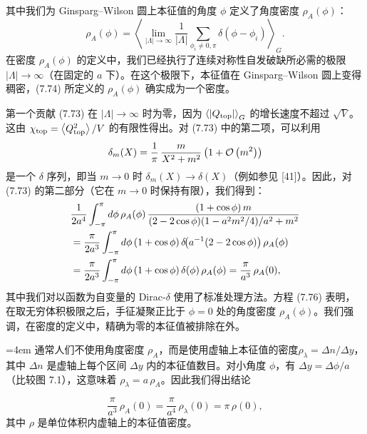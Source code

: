 其中我们为 Ginsparg--Wilson 圆上本征值的角度 $\phi$ 定义了角度密度 $\rho_A(\phi)$：
\begin{equation}
  \rho_A(\phi) = \left\langle \lim_{|\Lambda|\to\infty}\frac{1}{|\Lambda|}
  \sum_{\phi_i \neq 0,\pi}\delta(\phi-\phi_i)\right\rangle_G .
\end{equation}
在密度 $\rho_A(\phi)$ 的定义中，我们已经执行了连续对称性自发破缺所必需的极限 $|\Lambda| \to \infty$（在固定的 $a$ 下）。在这个极限下，本征值在 Ginsparg--Wilson 圆上变得稠密，(7.74) 所定义的 $\rho_A(\phi)$ 确实成为一个密度。

第一个贡献 (7.73) 在 $|\Lambda| \to \infty$ 时为零，因为 $\left\langle |Q_{\mathrm{top}}| \right\rangle_G$ 的增长速度不超过 $\sqrt{V}$。这由 $\chi_{\mathrm{top}} = \left\langle Q^2_{\mathrm{top}} \right\rangle/V$ 的有限性得出。对 (7.73) 中的第二项，可以利用
\begin{equation}
  \delta_m(X) = \frac{1}{\pi}\,\frac{m}{X^2 + m^2}\left(1 + \mathcal{O}\left(m^2\right)\right)
\end{equation}
是一个 $\delta$ 序列，即当 $m \to 0$ 时 $\delta_m(X) \to \delta(X)$（例如参见 [41]）。因此，对 (7.73) 的第二部分（它在 $m \to 0$ 时保持有限），我们得到：
\begin{align}
  &\frac{1}{2a^4}\int_{-\pi}^{\pi}d\phi\,\rho_A(\phi)\,
    \frac{(1+\cos\phi)\,m}{(2-2\cos\phi)(1-a^2m^2/4)/a^2 + m^2} \notag\\
  &= \frac{\pi}{2a^3}\int_{-\pi}^{\pi}d\phi\,(1+\cos\phi)\,
     \delta\!\bigl(a^{-1}(2-2\cos\phi)\bigr)\,\rho_A(\phi) \notag\\
  &= \frac{\pi}{2a^3}\int_{-\pi}^{\pi}d\phi\,(1+\cos\phi)\,
     \delta(\phi)\,\rho_A(\phi) = \frac{\pi}{a^3}\,\rho_A(0),
\end{align}
其中我们对以函数为自变量的 Dirac-$\delta$ 使用了标准处理方法。方程 (7.76) 表明，在取无穷体积极限之后，手征凝聚正比于 $\phi = 0$ 处的角度密度 $\rho_A(\phi)$。我们强调，在密度的定义中，精确为零的本征值被排除在外。

\begingroup\emergencystretch=4em 通常人们不使用角度密度 $\rho_A$，而是使用虚轴上本征值的密度\linebreak[0] $\rho_\lambda = \Delta n/\Delta y$，其中 $\Delta n$ 是虚轴上每个区间 $\Delta y$ 内的本征值数目。对小角度 $\phi$，有 $\Delta y = \Delta\phi/a$（比较图 7.1），这意味着 $\rho_\lambda = a\,\rho_A$。因此我们得出结论\par\endgroup
\begin{equation}
  \frac{\pi}{a^3}\,\rho_A(0) = \frac{\pi}{a^4}\,\rho_\lambda(0)
  = \pi\,\rho(0),
\end{equation}
其中 $\rho$ 是单位体积内虚轴上的本征值密度。

